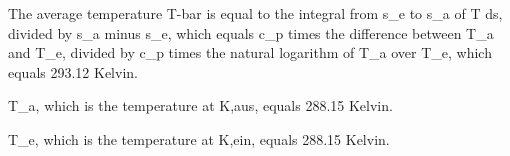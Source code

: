 The average temperature T-bar is equal to the integral from s_e to s_a of T ds, divided by s_a minus s_e, which equals c_p times the difference between T_a and T_e, divided by c_p times the natural logarithm of T_a over T_e, which equals 293.12 Kelvin.

T_a, which is the temperature at K,aus, equals 288.15 Kelvin.

T_e, which is the temperature at K,ein, equals 288.15 Kelvin.